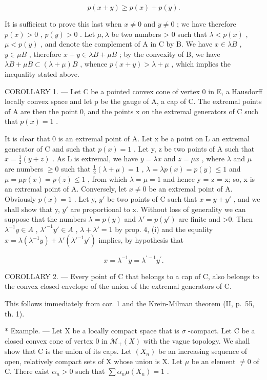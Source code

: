 \[
p (x + y) \geqslant p (x) + p (y).
\]

It is sufficient to prove this last when \(x \neq 0\) and \(y \neq 0\) ; we have therefore \(p(x) > 0\) , \(p(y) > 0\) . Let \(\mu, \lambda\) be two numbers \textgreater{} 0 such that \(\lambda < p(x)\) , \(\mu < p(y)\) , and denote the complement of A in C by B. We have \(x \in \lambda B\) , \(y \in \mu B\) , therefore \(x + y \in \lambda B + \mu B\) ; by the convexity of B, we have \(\lambda B + \mu B \subset (\lambda + \mu)B\) , whence \(p(x + y) > \lambda + \mu\) , which implies the inequality stated above.

COROLLARY 1. --- Let C be a pointed convex cone of vertex 0 in E, a Hausdorff locally convex space and let p be the gauge of A, a cap of C. The extremal points of A are then the point 0, and the points x on the extremal generators of C such that \(p(x) = 1\) .

It is clear that 0 is an extremal point of A. Let x be a point on L an extremal generator of C and such that \(p(x) = 1\) . Let y, z be two points of A such that \(x = \frac{1}{2}(y + z)\) . As L is extremal, we have \(y = \lambda x\) and \(z = \mu x\) , where \(\lambda\) and \(\mu\) are numbers \(\geqslant 0\) such that \(\frac{1}{2}(\lambda + \mu) = 1\) , \(\lambda = \lambda p(x) = p(y) \leqslant 1\) and \(\mu = \mu p(x) = p(z) \leqslant 1\) , from which \(\lambda = \mu = 1\) and hence y = z = x; so, x is an extremal point of A. Conversely, let \(x \neq 0\) be an extremal point of A. Obviously \(p(x) = 1\) . Let y, \(y'\) be two points of C such that \(x = y + y'\) , and we shall show that y, \(y'\) are proportional to x. Without loss of generality we can suppose that the numbers \(\lambda = p(y)\) and \(\lambda' = p(y')\) are finite and \textgreater0. Then \(\lambda^{-1}y \in A\) , \(\lambda'^{-1}y' \in A\) , \(\lambda + \lambda' = 1\) by prop. 4, (i) and the equality \(x = \lambda(\lambda^{-1}y) + \lambda'(\lambda'^{-1}y')\) implies, by hypothesis that

\[
x = \lambda^ {- 1} y = \lambda^ {\prime - 1} y ^ {\prime}.
\]

COROLLARY 2. --- Every point of C that belongs to a cap of C, also belongs to the convex closed envelope of the union of the extremal generators of C.

This follows immediately from cor. 1 and the Krein-Milman theorem (II, p.~55, th. 1).

* Example. --- Let X be a locally compact space that is \(\sigma\) -compact. Let C be a closed convex cone of vertex 0 in \(\mathcal{M}_{+}(X)\) with the vague topology. We shall show that C is the union of its caps. Let \((X_{n})\) be an increasing sequence of open, relatively compact sets of X whose union is X. Let \(\mu\) be an element \(\neq 0\) of C. There exist \(\alpha_{n} > 0\) such that \(\sum \alpha_{n}\mu(X_{n}) = 1\) .

